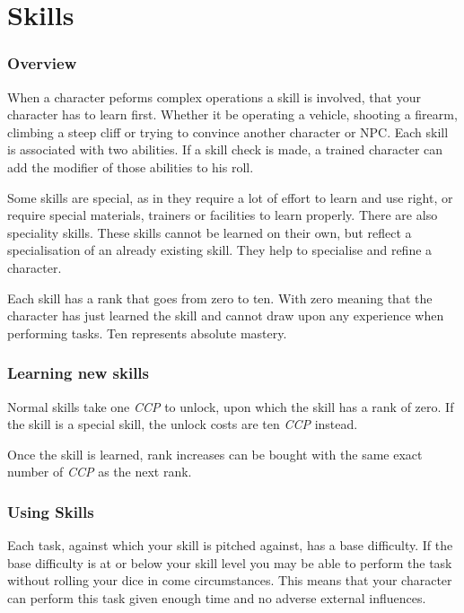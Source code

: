 \chapter{Skills}

\subsection{Overview}

When a character peforms complex operations a skill is involved, that your
character has to learn first. Whether it be operating a vehicle, shooting a
firearm, climbing a steep cliff or trying to convince another character or
NPC. Each skill is associated with two abilities. If a skill check is made,
a trained character can add the modifier of those abilities to his roll.

Some skills are special, as in they require a lot of effort to learn and use
right, or require special materials, trainers or facilities to learn properly.
There are also speciality skills. These skills cannot be learned on their own,
but reflect a specialisation of an already existing skill. They help to
specialise and refine a character.

Each skill has a rank that goes from zero to ten. With zero meaning that the
character has just learned the skill and cannot draw upon any experience when
performing tasks. Ten represents absolute mastery.

\subsection{Learning new skills}

Normal skills take one \emph{CCP} to unlock, upon which the skill has a rank
of zero. If the skill is a special skill, the unlock costs are ten \emph{CCP}
instead.

Once the skill is learned, rank increases can be bought with the same exact
number of \emph{CCP} as the next rank.

\subsection{Using Skills}

Each task, against which your skill is pitched against, has a base difficulty.
If the base difficulty is at or below your skill level you may be able to
perform the task without rolling your dice in come circumstances. This means
that your character can perform this task given enough time and no adverse
external influences.

